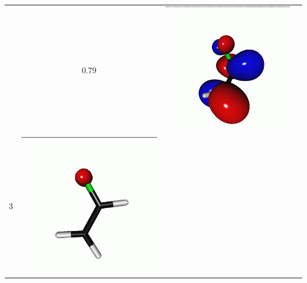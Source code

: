 \documentclass[journal=jctcce,manuscript=article]{achemso}
\begin{document}
\begin{table}[H]
\begin{tabular}{ c | c c c }
\begin{minipage}{0.2\textwidth}
     \end{minipage}
     & 0.79
     &  \begin{minipage}{0.2\textwidth}
         \centering
         \includegraphics[scale=0.10]{NTO/CH2CHF/CH2CHF_F_2p.png}
     \end{minipage}
     \\
             3 &  
     \begin{minipage}{0.2\textwidth}
         \centering
         \includegraphics[scale=0.10]{NTO/CH2CHF/CH2CHF_F_3h.png}

\end{minipage}
\end{tabular}
\end{table}
\end{document}

